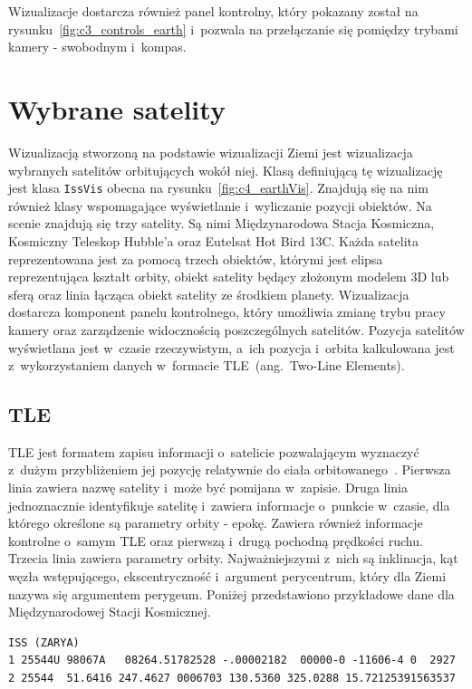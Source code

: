 Wizualizacje dostarcza również panel kontrolny, który pokazany został na rysunku~\ref{fig:c3_controls_earth} i~pozwala na przełączanie się pomiędzy trybami kamery - swobodnym i~kompas.

\section{Wybrane satelity}

Wizualizacją stworzoną na podstawie wizualizacji Ziemi jest wizualizacja wybranych satelitów orbitujących wokół niej. Klasą definiującą tę wizualizację jest klasa \texttt{IssVis} obecna na rysunku~\ref{fig:c4_earthVis}. Znajdują się na nim również klasy wspomagające wyświetlanie i~wyliczanie pozycji obiektów. Na scenie znajdują się trzy satelity. Są nimi Międzynarodowa Stacja Kosmiczna, Kosmiczny Teleskop Hubble'a oraz Eutelsat Hot Bird 13C. Każda satelita reprezentowana jest za pomocą trzech obiektów, którymi jest elipsa reprezentująca kształt orbity, obiekt satelity będący złożonym modelem 3D lub sferą oraz linia łącząca obiekt satelity ze środkiem planety.  Wizualizacja dostarcza komponent panelu kontrolnego, który umożliwia zmianę trybu pracy kamery oraz zarządzenie widocznością poszczególnych satelitów. Pozycja satelitów wyświetlana jest w~czasie rzeczywistym, a~ich pozycja i~orbita kalkulowana jest z~wykorzystaniem danych w~formacie TLE~(ang.~Two-Line Elements).

\subsection{TLE}
TLE jest formatem zapisu informacji o~satelicie pozwalającym wyznaczyć z~dużym przybliżeniem jej pozycję relatywnie do ciała orbitowanego~\cite{TLE}. Pierwsza linia zawiera nazwę satelity i~może być pomijana w~zapisie. Druga linia jednoznacznie identyfikuje satelitę i~zawiera informacje o~punkcie w~czasie, dla którego określone są parametry orbity - epokę. Zawiera również informacje kontrolne o~samym TLE oraz pierwszą i~drugą pochodną prędkości ruchu. Trzecia linia zawiera parametry orbity. Najważniejszymi z~nich są inklinacja, kąt węzła wstępującego, ekscentryczność i~argument perycentrum, który dla Ziemi nazywa się argumentem perygeum. Poniżej przedstawiono przykładowe dane dla Międzynarodowej Stacji Kosmicznej.
\begin{verbatim}
ISS (ZARYA)
1 25544U 98067A   08264.51782528 -.00002182  00000-0 -11606-4 0  2927
2 25544  51.6416 247.4627 0006703 130.5360 325.0288 15.72125391563537
\end{verbatim}

